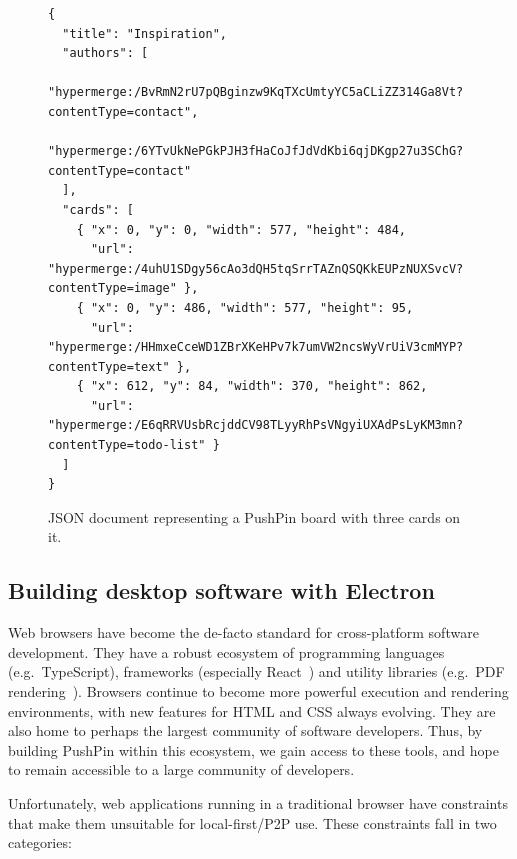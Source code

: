\documentclass[sigplan,10pt]{acmart}
\begin{document}
\begin{figure}
\begin{verbatim}
{
  "title": "Inspiration",
  "authors": [
    "hypermerge:/BvRmN2rU7pQBginzw9KqTXcUmtyYC5aCLiZZ314Ga8Vt?contentType=contact",
    "hypermerge:/6YTvUkNePGkPJH3fHaCoJfJdVdKbi6qjDKgp27u3SChG?contentType=contact"
  ],
  "cards": [
    { "x": 0, "y": 0, "width": 577, "height": 484,
      "url": "hypermerge:/4uhU1SDgy56cAo3dQH5tqSrrTAZnQSQKkEUPzNUXSvcV?contentType=image" },
    { "x": 0, "y": 486, "width": 577, "height": 95,
      "url": "hypermerge:/HHmxeCceWD1ZBrXKeHPv7k7umVW2ncsWyVrUiV3cmMYP?contentType=text" },
    { "x": 612, "y": 84, "width": 370, "height": 862,
      "url": "hypermerge:/E6qRRVUsbRcjddCV98TLyyRhPsVNgyiUXAdPsLyKM3mn?contentType=todo-list" }
  ]
}
\end{verbatim}
\caption{JSON document representing a PushPin board with three cards on it.}
\label{fig:board-json}
\end{figure}

\subsection{Building desktop software with Electron}

Web browsers have become the de-facto standard for cross-platform software development. They have a robust ecosystem of programming languages (e.g.\ TypeScript), frameworks (especially React~\cite{React}) and utility libraries (e.g.\ PDF rendering~\cite{PDFjs}). Browsers continue to become more powerful execution and rendering environments, with new features for HTML and CSS always evolving. They are also home to perhaps the largest community of software developers. Thus, by building PushPin within this ecosystem, we gain access to these tools, and hope to remain accessible to a large community of developers.

Unfortunately, web applications running in a traditional browser have constraints that make them unsuitable for local-first/P2P use. These constraints fall in two categories:
\end{document}
